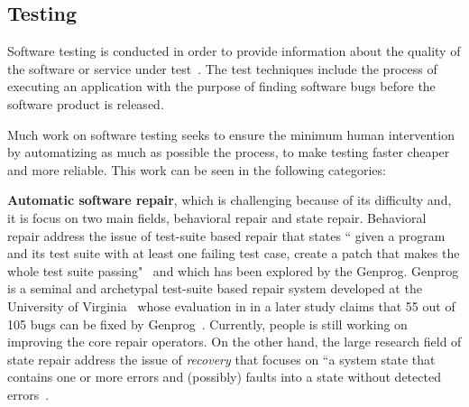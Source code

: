 \documentclass[a4paper, 12pt]{book}
\begin{document}
\subsection{Testing}
Software testing is conducted in order to provide information about the quality of the software or service under test~\cite{kaner2006exploratory}. The test techniques include the process of executing an application with the purpose of finding software bugs before the software product is released.

Much work on software testing seeks to ensure the minimum human intervention by automatizing as much as possible the process, to make testing faster cheaper and more reliable. This work can be seen in the following categories:

\textbf{Automatic software repair}, which is challenging because of its difficulty and, it is focus on two main fields, behavioral repair and state repair. Behavioral repair address the issue of test-suite based repair that states `` given a program and its test suite with at least one failing test case, create a patch that makes the whole test suite passing"~\cite{monperrus2014critical} and which has been explored by the Genprog. Genprog is a seminal and archetypal test-suite based repair system developed at the University of Virginia~\cite{weimer2009automatically,forrest2009genetic} whose evaluation in in a later study claims that 55 out of 105 bugs can be fixed by Genprog~\cite{le2012systematic}. Currently, people is still working on improving the core repair operators. On the other hand, the large research field of state repair address the issue of \emph{recovery} that focuses on ``a system state that contains one or more errors and (possibly) faults into a state without detected errors~\cite{laprie1985dependable}.
\end{document}
